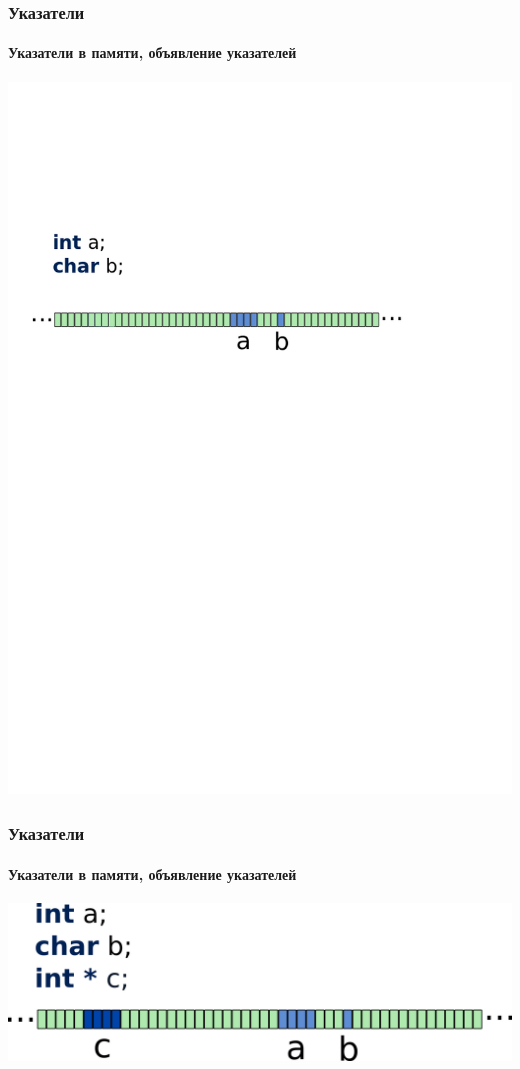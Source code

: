\documentclass[14pt,pdf,hyperref={unicode}]{beamer}
\begin{document}
\begin{frame}[fragile]
\frametitle{Указатели} 
\framesubtitle{Указатели в памяти, объявление указателей}
\begin{center}
\includegraphics[width=0.95\linewidth]{images/memory_pointer_0.png}
\end{center}
\end{frame}

\begin{frame}[fragile]
\frametitle{Указатели} 
\framesubtitle{Указатели в памяти, объявление указателей}
\begin{center}
\includegraphics[width=0.95\linewidth]{images/memory_pointer_1.png}
\end{center}
\end{frame}
\end{document}
